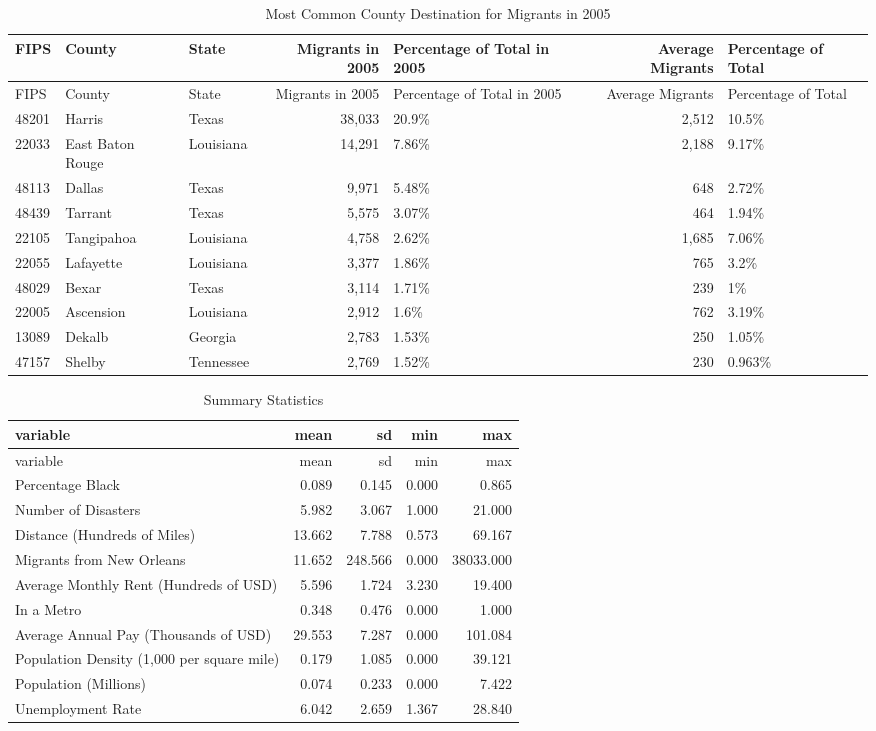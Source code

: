 \documentclass[]{article}
\begin{document}
\clearpage

\begin{longtable}[]{@{}lllrlrl@{}}
\caption{Most Common County Destination for Migrants in 2005
\label{tab:commondest}}\tabularnewline
\toprule
FIPS & County & State & Migrants in 2005 & Percentage of Total in 2005 &
Average Migrants & Percentage of Total\tabularnewline
\midrule
\endfirsthead
\toprule
FIPS & County & State & Migrants in 2005 & Percentage of Total in 2005 &
Average Migrants & Percentage of Total\tabularnewline
\midrule
\endhead
48201 & Harris & Texas & 38,033 & 20.9\% & 2,512 & 10.5\%\tabularnewline
22033 & East Baton Rouge & Louisiana & 14,291 & 7.86\% & 2,188 &
9.17\%\tabularnewline
48113 & Dallas & Texas & 9,971 & 5.48\% & 648 & 2.72\%\tabularnewline
48439 & Tarrant & Texas & 5,575 & 3.07\% & 464 & 1.94\%\tabularnewline
22105 & Tangipahoa & Louisiana & 4,758 & 2.62\% & 1,685 &
7.06\%\tabularnewline
22055 & Lafayette & Louisiana & 3,377 & 1.86\% & 765 &
3.2\%\tabularnewline
48029 & Bexar & Texas & 3,114 & 1.71\% & 239 & 1\%\tabularnewline
22005 & Ascension & Louisiana & 2,912 & 1.6\% & 762 &
3.19\%\tabularnewline
13089 & Dekalb & Georgia & 2,783 & 1.53\% & 250 & 1.05\%\tabularnewline
47157 & Shelby & Tennessee & 2,769 & 1.52\% & 230 &
0.963\%\tabularnewline
\bottomrule
\end{longtable}

\clearpage

\begin{longtable}[]{@{}lrrrr@{}}
\caption{Summary Statistics \label{tab:sumstats}}\tabularnewline
\toprule
variable & mean & sd & min & max\tabularnewline
\midrule
\endfirsthead
\toprule
variable & mean & sd & min & max\tabularnewline
\midrule
\endhead
Percentage Black & 0.089 & 0.145 & 0.000 & 0.865\tabularnewline
Number of Disasters & 5.982 & 3.067 & 1.000 & 21.000\tabularnewline
Distance (Hundreds of Miles) & 13.662 & 7.788 & 0.573 &
69.167\tabularnewline
Migrants from New Orleans & 11.652 & 248.566 & 0.000 &
38033.000\tabularnewline
Average Monthly Rent (Hundreds of USD) & 5.596 & 1.724 & 3.230 &
19.400\tabularnewline
In a Metro & 0.348 & 0.476 & 0.000 & 1.000\tabularnewline
Average Annual Pay (Thousands of USD) & 29.553 & 7.287 & 0.000 &
101.084\tabularnewline
Population Density (1,000 per square mile) & 0.179 & 1.085 & 0.000 &
39.121\tabularnewline
Population (Millions) & 0.074 & 0.233 & 0.000 & 7.422\tabularnewline
Unemployment Rate & 6.042 & 2.659 & 1.367 & 28.840\tabularnewline
\bottomrule
\end{longtable}

\clearpage
\end{document}
